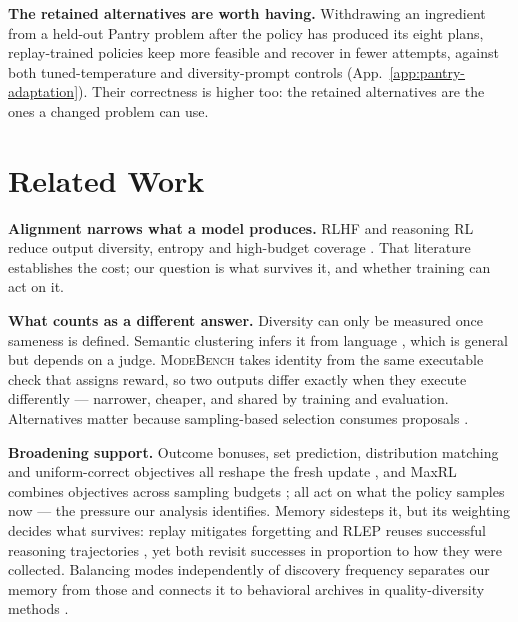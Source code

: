 \documentclass{article}
\newcommand{\1}{\mathbf 1}
\newcommand{\mb}{\textsc{ModeBench}}
\theoremstyle{remark}
\theoremstyle{definition}
\theoremstyle{plain}
\begin{document}
\textbf{The retained alternatives are worth having.} Withdrawing an ingredient from a held-out Pantry problem after
the policy has produced its eight plans, replay-trained policies keep more
feasible and recover in fewer attempts, against both tuned-temperature and
diversity-prompt controls
(App.~\ref{app:pantry-adaptation}). Their correctness is higher too: the
retained alternatives are the ones a changed problem can use.

\section{Related Work}
\label{sec:related}

\textbf{Alignment narrows what a model produces.} RLHF and reasoning RL reduce
output diversity, entropy and high-budget coverage
\citep{kirk2024understanding,dang2025diversity,cui2025entropy,yue2025rlvrlimit}.
That literature establishes the cost; our question is what survives it, and
whether training can act on it.

\textbf{What counts as a different answer.} Diversity can only be measured once
sameness is defined. Semantic clustering infers it from language
\citep{farquhar2024detecting}, which is general but depends on a judge. \mb{}
takes identity from the same executable check that assigns reward, so two
outputs differ exactly when they execute differently --- narrower, cheaper, and
shared by training and evaluation. Alternatives matter because sampling-based
selection consumes proposals
\citep{brown2024monkeys,snell2024testtime,cobbe2021training,lightman2023lets}.

\textbf{Broadening support.} Outcome bonuses, set prediction, distribution
matching and uniform-correct objectives all reshape the fresh update
\citep{song2025outcome,chen2025passktraining,li2025divergence,li2026setpo,li2026distribution,lochab2026ucpo},
and MaxRL combines objectives across sampling budgets \citep{tajwar2026maxrl};
all act on what the policy samples now --- the pressure our analysis
identifies. Memory sidesteps it, but its weighting decides what survives:
replay mitigates forgetting
\citep{lin1992selfimproving,rolnick2019replay} and RLEP reuses successful
reasoning trajectories \citep{zhang2025rlep}, yet both revisit successes in
proportion to how they were collected. Balancing modes independently of
discovery frequency separates our memory from those and connects it to
behavioral archives in quality-diversity methods
\citep{mouret2015illuminating,ecoffet2021return}.
\end{document}
